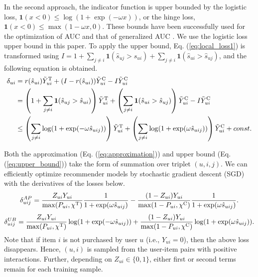 \documentclass[manuscript,screen]{acmart}
\begin{document}
In the second approach, the indicator function is upper bounded by the logistic loss, $\boldsymbol{1}(x < 0) \leq \log (1+\exp(-\omega x))$, or the hinge loss, $\boldsymbol{1}(x < 0) \leq \max(1-\omega x, 0)$.
These bounds have been successfully used for the optimization of AUC \cite{Rendle09} and that of generalized AUC \cite{Song15}.
We use the logistic loss upper bound in this paper.
To apply the upper bound, Eq. (\ref{eq:local_loss1}) is transformed using $I = 1 + \sum_{j \neq i} \boldsymbol{1}(\hat{s}_{uj} > \hat{s}_{ui}) + \sum_{j \neq i} \boldsymbol{1}(\hat{s}_{ui} > \hat{s}_{uj})$, and the following equation is obtained.
\begin{align} 
\label{eq:upper_bound}
\delta_{ui} 
&= r (\hat{s}_{ui}) \tilde{Y}_{ui}^\textnormal{T} +  (I - r (\hat{s}_{ui})) \tilde{Y}_{ui}^\textnormal{C} - I \tilde{Y}_{ui}^\textnormal{C} \nonumber \\
&= \left(1 + \sum_{j \neq i} \boldsymbol{1}(\hat{s}_{uj} > \hat{s}_{ui})\right) \tilde{Y}_{ui}^\textnormal{T} + \left(\sum_{j \neq i} \boldsymbol{1}(\hat{s}_{ui} > \hat{s}_{uj})\right) \tilde{Y}_{ui}^\textnormal{C} - I \tilde{Y}_{ui}^\textnormal{C}\nonumber \\
& \leq \left(\sum_{j \neq i} \log (1+\exp(-\omega \hat{s}_{uij})) \right) \tilde{Y}_{ui}^\textnormal{T} + \left(\sum_{j \neq i} \log (1+\exp(\omega \hat{s}_{uij})) \right) \tilde{Y}_{ui}^\textnormal{C} + const.
\end{align}

Both the approximation (Eq. (\ref{eq:approximation})) and upper bound (Eq. (\ref{eq:upper_bound})) take the form of summation over triplet $(u, i, j)$.
We can efficiently optimize recommender models by stochastic gradient descent (SGD) with the derivatives of the losses below.
\begin{equation} 
\label{eq:approximation_local_loss}
\delta_{uij}^{AP} = \frac{Z_{ui} Y_{ui}}{\max(P_{ui}, \chi^\textnormal{T})}\frac{1}{1+\exp(\omega \hat{s}_{uij})} - \frac{(1-Z_{ui}) Y_{ui}}{\max(1-P_{ui}, \chi^\textnormal{C})}\frac{1}{1+\exp(\omega \hat{s}_{uij})}.
\end{equation}
\begin{equation} 
\label{eq:upper_bound_local_loss}
\delta_{uij}^{UB} = \frac{Z_{ui} Y_{ui}}{\max(P_{ui}, \chi^\textnormal{T})}\log (1+\exp(-\omega \hat{s}_{uij})) + \frac{(1-Z_{ui}) Y_{ui}}{\max(1-P_{ui}, \chi^\textnormal{C})}\log (1+\exp(\omega \hat{s}_{uij})).
\end{equation}
Note that if item $i$ is not purchased by user $u$ (i.e., $Y_{ui}=0$), then the above loss disappears.
Hence, $(u, i)$ is sampled from the user-item pairs with positive interactions.
Further, depending on $Z_{ui} \in \{0, 1\}$, either first or second terms remain for each training sample.
\end{document}
